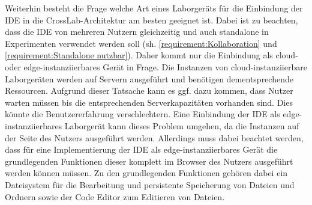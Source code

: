 Weiterhin besteht die Frage welche Art eines Laborgeräts für die Einbindung der IDE in die CrossLab-Architektur am besten geeignet ist. Dabei ist zu beachten, dass die IDE von mehreren Nutzern gleichzeitig und auch standalone in Experimenten verwendet werden soll (sh. \autoref{requirement:Kollaboration} und \autoref{requirement:Standalone nutzbar}). Daher kommt nur die Einbindung als cloud- oder edge-instanziierbares Gerät in Frage. Die Instanzen von cloud-instanziierbare Laborgeräten werden auf Servern ausgeführt und benötigen dementsprechende Ressourcen. Aufgrund dieser Tatsache kann es ggf. dazu kommen, dass Nutzer warten müssen bis die entsprechenden Serverkapazitäten vorhanden sind. Dies könnte die Benutzererfahrung verschlechtern. Eine Einbindung der IDE als edge-instanziierbares Laborgerät kann dieses Problem umgehen, da die Instanzen auf der Seite des Nutzers ausgeführt werden. Allerdings muss dabei beachtet werden, dass für eine Implementierung der IDE als edge-instanziierbares Gerät die grundlegenden Funktionen dieser komplett im Browser des Nutzers ausgeführt werden können müssen. Zu den grundlegenden Funktionen gehören dabei ein Dateisystem für die Bearbeitung und persistente Speicherung von Dateien und Ordnern sowie der Code Editor zum Editieren von Dateien.
